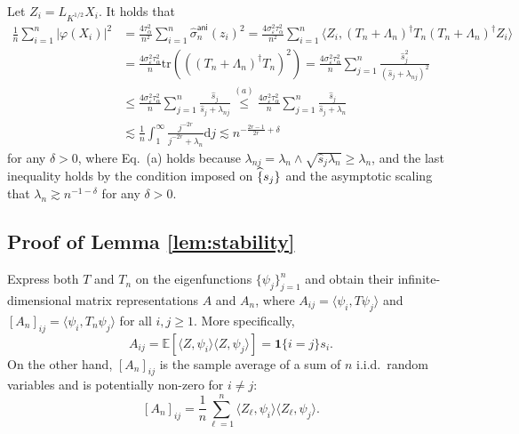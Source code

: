 \documentclass[11pt,a4paper]{article}
\renewcommand{\hat}{\widehat}
\newcommand{\vct}{\boldsymbol}
\newcommand{\tr}{\mathrm{tr}}
\theoremstyle{definition}
\theoremstyle{plain}
\theoremstyle{remark}
\newcommand{\ud}{\mathrm d}
\newcommand{\ani}{\mathsf{ani}}
\begin{document}
Let $Z_i=L_{K^{1/2}}X_i$.
It holds that
\begin{align*}
\frac{1}{n}\sum_{i=1}^n\big|\varphi(X_i)\big|^2 &= \frac{4\tau_\alpha^2}{n^2}\sum_{i=1}^n\hat\sigma_n^\ani(z_i)^2 = \frac{4\sigma_\varepsilon^2\tau_\alpha^2}{n^2}\sum_{i=1}^n \langle Z_i, (T_n+\Lambda_n)^{\dagger}T_n(T_n+\Lambda_n)^{\dagger}Z_i\rangle\\
&= \frac{4\sigma_\varepsilon^2\tau_\alpha^2}{n}\tr(((T_n+\Lambda_n)^{\dagger}T_n)^2) = \frac{4\sigma_\varepsilon^2\tau_\alpha^2}{n}\sum_{j=1}^n\frac{\hat s_j^2}{(\hat s_j+\lambda_{nj})^2}\\
&\leq \frac{4\sigma_\varepsilon^2\tau_\alpha^2}{n}\sum_{j=1}^n\frac{\hat s_j}{\hat s_j+\lambda_{nj}} \overset{(a)}{\leq} \frac{4\sigma_\varepsilon^2\tau_\alpha^2}{n}\sum_{j=1}^n\frac{\hat s_j}{\hat s_j+\lambda_n}\\
&\lesssim \frac{1}{n}\int_1^{\infty} \frac{j^{-2r}}{j^{-2r}+\lambda_n}\ud j \lesssim n^{-\frac{2r-1}{2r}+\delta}
\end{align*}
for any $\delta>0$, where Eq.~(a) holds because $\lambda_{nj}=\lambda_n\wedge \sqrt{\hat s_j\lambda_n}\geq\lambda_n$, and
the last inequality holds by the condition imposed on $\hat\{s_j\}$ and the asymptotic scaling that $\lambda_n\gtrsim n^{-1-\delta}$ for any $\delta>0$.




\subsection{Proof of Lemma \ref{lem:stability}}

Express both $T$ and $T_n$ on the eigenfunctions $\{\psi_j\}_{j=1}^n$ and obtain their infinite-dimensional matrix representations $A$ and $A_n$,
where $A_{ij}=\langle \psi_i,T\psi_j\rangle$ and $[A_n]_{ij}=\langle\psi_i, T_n\psi_j\rangle$ for all $i,j\geq 1$.
More specifically,
$$
A_{ij} = \mathbb E[\langle Z,\psi_i\rangle\langle Z,\psi_j\rangle] = \vct 1\{i=j\}s_i.
$$
On the other hand, $[A_n]_{ij}$ is the sample average of a sum of $n$ i.i.d.~random variables and is potentially non-zero for $i\neq j$:
$$
[A_n]_{ij} = \frac{1}{n}\sum_{\ell=1}^n \langle Z_\ell,\psi_i\rangle\langle Z_\ell,\psi_j\rangle.
$$

\end{document}
